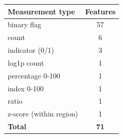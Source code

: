 \begin{tabular}{lc}
\toprule
\textbf{Measurement type} & \textbf{Features} \\
\midrule
binary flag & 57 \\
count & 6 \\
indicator (0/1) & 3 \\
log1p count & 1 \\
percentage 0-100 & 1 \\
index 0-100 & 1 \\
ratio & 1 \\
z-score (within region) & 1 \\
\midrule
\textbf{Total} & \textbf{71} \\
\bottomrule
\end{tabular}
